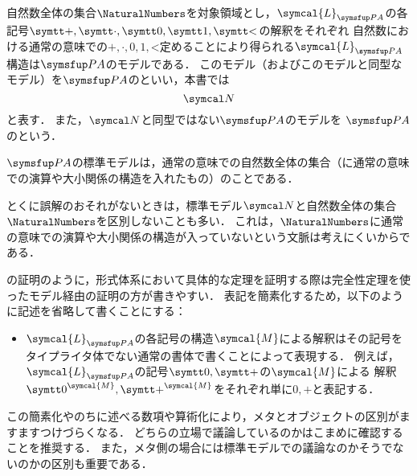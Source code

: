 \begin{Def} \label{Def:standardstructure}
	自然数全体の集合\(\NaturalNumbers\)を対象領域とし，\(\symcal{L}_{\PA}\)の各記号\(\obj{+}, \obj{\cdot}, \obj{0}, \obj{1}, \obj{<}\)の解釈をそれぞれ
	自然数における通常の意味での\(\mathord{+}, \mathord{\cdot}, 0, 1, \mathord{<}\)定めることにより得られる\(\symcal{L}_{\PA}\)構造は\(\PA\)のモデルである．
	このモデル（およびこのモデルと同型なモデル）を\(\PA\)のといい，本書では
	\begin{equation}
		\standardmodel
		\label{eq:standardmodel}
	\end{equation}
	と表す．
	また，\(\standardmodel\)と同型ではない\(\PA\)のモデルを
	\(\PA\)のという．

	\(\PA\)の標準モデルは，通常の意味での自然数全体の集合（に通常の意味での演算や大小関係の構造を入れたもの）のことである．
\end{Def}

\begin{Note}
	とくに誤解のおそれがないときは，標準モデル\(\standardmodel\)と自然数全体の集合\(\NaturalNumbers\)を区別しないことも多い．
	これは，\(\NaturalNumbers\)に通常の意味での演算や大小関係の構造が入っていないという文脈は考えにくいからである．
\end{Note}

\begin{Note}
	の証明のように，形式体系において具体的な定理を証明する際は完全性定理を使ったモデル経由の証明の方が書きやすい．
	表記を簡素化するため，以下のように記述を省略して書くことにする：
	\begin{itemize}
		\item \(\symcal{L}_{\PA}\)の各記号の構造\(\symcal{M}\)による解釈はその記号をタイプライタ体でない通常の書体で書くことによって表現する．
		      例えば，\(\symcal{L}_{\PA}\)の記号\(\obj{0}, \obj{+}\)の\(\symcal{M}\)による
		      解釈\(\interpretation{\symcal{M}}{\obj{0}}, \interpretation{\symcal{M}}{\obj{+}}\)をそれぞれ単に\(0, +\)と表記する．
	\end{itemize}

	この簡素化やのちに述べる数項や算術化により，メタとオブジェクトの区別がますますつけづらくなる．
	どちらの立場で議論しているのかはこまめに確認することを推奨する．
	また，メタ側の場合には標準モデルでの議論なのかそうでないのかの区別も重要である．
\end{Note}



